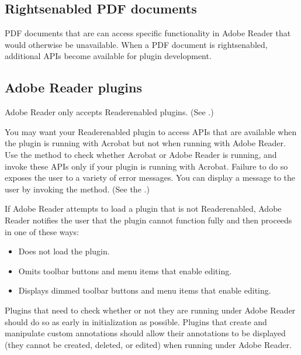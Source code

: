 \documentclass[letterpaper,12pt,english,openany,oneside]{sphinxmanual}
\begin{document}
\subsection{Rights\sphinxhyphen{}enabled PDF documents}
\label{\detokenize{index:rights-enabled-pdf-documents}}
PDF documents that are  can access specific functionality in Adobe Reader that would otherwise be unavailable. When a PDF document is rights\sphinxhyphen{}enabled, additional APIs become available for plugin development.


\subsection{Adobe Reader plugins}
\label{\detokenize{index:adobe-reader-plugins}}
Adobe Reader only accepts Reader\sphinxhyphen{}enabled plugins. (See .)

You may want your Reader\sphinxhyphen{}enabled plugin to access APIs that are available when the plugin is running with Acrobat but not when running with Adobe Reader. Use the  method to check whether Acrobat or Adobe Reader is running, and invoke these APIs only if your plugin is running with Acrobat. Failure to do so exposes the user to a variety of error messages. You can display a message to the user by invoking the  method. (See the .)

If Adobe Reader attempts to load a plugin that is not Reader\sphinxhyphen{}enabled, Adobe Reader notifies the user that the plugin cannot function fully and then proceeds in one of these ways:
\begin{itemize}
\item {} 
Does not load the plugin.

\item {} 
Omits toolbar buttons and menu items that enable editing.

\item {} 
Displays dimmed toolbar buttons and menu items that enable editing.

\end{itemize}

Plugins that need to check whether or not they are running under Adobe Reader should do so as early in initialization as possible. Plugins that create and manipulate custom annotations should allow their annotations to be displayed (they cannot be created, deleted, or edited) when running under Adobe Reader.
\end{document}
